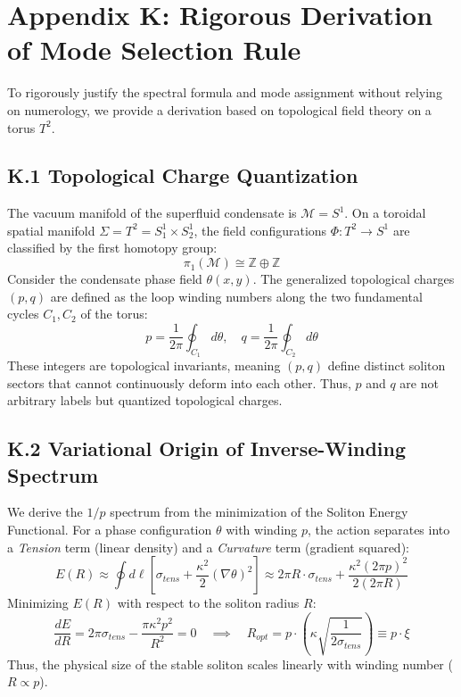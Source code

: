 \documentclass[a4paper,12pt]{article}
\begin{document}
\newpage
\section{Appendix K: Rigorous Derivation of Mode Selection Rule}

To rigorously justify the spectral formula and mode assignment without relying on numerology, we provide a derivation based on topological field theory on a torus $T^2$.

\subsection{K.1 Topological Charge Quantization}
The vacuum manifold of the superfluid condensate is $\mathcal{M} = S^1$. On a toroidal spatial manifold $\Sigma = T^2 = S^1_1 \times S^1_2$, the field configurations $\Phi: T^2 \to S^1$ are classified by the first homotopy group:
\begin{equation}
\pi_1(\mathcal{M}) \cong \mathbb{Z} \oplus \mathbb{Z}
\end{equation}
Consider the condensate phase field $\theta(x, y)$. The generalized topological charges $(p, q)$ are defined as the loop winding numbers along the two fundamental cycles $C_1, C_2$ of the torus:
\begin{equation}
p = \frac{1}{2\pi} \oint_{C_1} d\theta, \quad q = \frac{1}{2\pi} \oint_{C_2} d\theta
\end{equation}
These integers are topological invariants, meaning $(p,q)$ define distinct soliton sectors that cannot continuously deform into each other. Thus, $p$ and $q$ are not arbitrary labels but quantized topological charges.

\subsection{K.2 Variational Origin of Inverse-Winding Spectrum}
We derive the $1/p$ spectrum from the minimization of the Soliton Energy Functional.
For a phase configuration $\theta$ with winding $p$, the action separates into a \emph{Tension} term (linear density) and a \emph{Curvature} term (gradient squared):
\begin{equation}
 E(R) \approx \oint d\ell \left[ \sigma_{tens} + \frac{\kappa^2}{2} (\nabla \theta)^2 \right] \approx 2\pi R \cdot \sigma_{tens} + \frac{\kappa^2 (2\pi p)^2}{2 (2\pi R)}
\end{equation}
Minimizing $E(R)$ with respect to the soliton radius $R$:
\begin{equation}
 \frac{dE}{dR} = 2\pi \sigma_{tens} - \frac{\pi \kappa^2 p^2}{R^2} = 0 \quad \implies \quad R_{opt} = p \cdot \left( \kappa \sqrt{\frac{1}{2\sigma_{tens}}} \right) \equiv p \cdot \xi
\end{equation}
Thus, the physical size of the stable soliton scales linearly with winding number ($R \propto p$).
\end{document}
